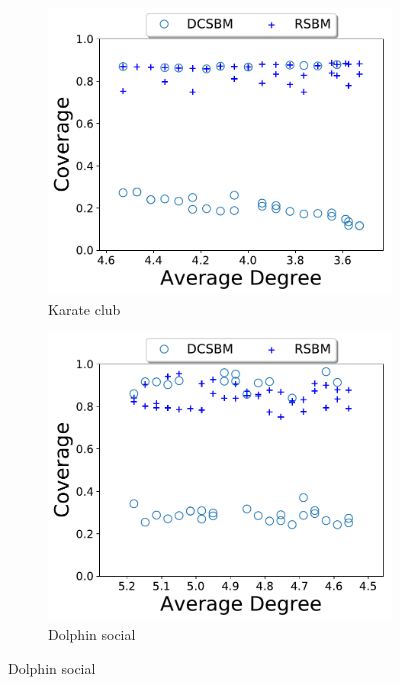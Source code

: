 \begin{figure}[!htb]
    \centering
    
\begin{subfigure}{.3\textwidth} 
\centering
\includegraphics[width=.99\linewidth]{img/chap2/karate_scatter_real.pdf}
\caption{Karate club}
\end{subfigure}
\begin{subfigure}{.3\textwidth} 
\centering
\includegraphics[width=.99\linewidth]{img/chap2/dolphins_scatter_real.pdf}
\caption{Dolphin social}
\end{subfigure}

\end{figure}
